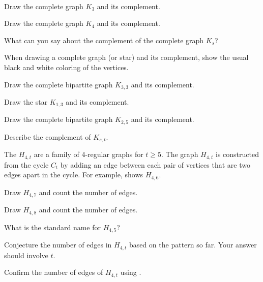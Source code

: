 \begin{exer}[\exerU] %
\label{exer_graph_comp_complete}
~
    \begin{exerpart}
        \item Draw the complete graph $K_3$ and its complement.
        \item Draw the complete graph $K_4$ and its complement.
        \item What can you say about the complement of the complete graph $K_s$?
    \end{exerpart}
\end{exer}

\begin{exer}[\exerU] %
\label{exer_comp_complete_bipartite}
    When drawing a complete graph (or star) and its complement, show the usual black and white coloring of the vertices.
    \begin{exerpart}
        \item Draw the complete bipartite graph $K_{3,3}$ and its complement.
        \item Draw the star $K_{1,3}$ and its complement. 
        \item Draw the complete bipartite graph $K_{2,5}$ and its complement.
        \item Describe the complement of $K_{s,t}$.
    \end{exerpart}
\end{exer}

\begin{exer}[\exerU] %
\label{exer_harary}
    The  $H_{4,t}$ are a family of 4-regular graphs for $t \ge 5$.  The graph $H_{4,t}$ is constructed from the cycle $C_t$ by adding an edge between each pair of vertices that are two edges apart in the cycle.  For example,  shows $H_{4,6}$.
        \begin{exerpart}
            \item Draw $H_{4,7}$ and count the number of edges.
            \item Draw $H_{4,8}$ and count the number of edges.
            \item What is the standard name for $H_{4,5}$?
            \item Conjecture the number of edges in $H_{4,t}$ based on the pattern so far. Your answer should involve $t$.
            \item Confirm the number of edges of $H_{4,t}$ using .
        \end{exerpart}
\end{exer}

